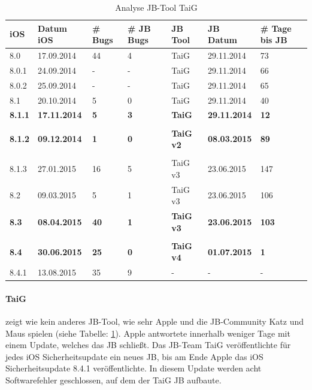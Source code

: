 \begin{table}[htp!]
    \begin{center}
        \begin{tabular}{| p{10mm} | p{22mm} | p{17mm} | p{12mm} | p{18mm} | p{22mm} | p{15mm} |} \hline
            \textbf{iOS} & \textbf{Datum iOS} & \textbf{\# Bugs} & \textbf{\# JB Bugs} & \textbf{JB Tool} & \textbf{JB Datum} & \textbf{\# Tage bis JB} \\ \hline 
8.0 & 17.09.2014 & 44 & 4 & TaiG & 29.11.2014 & 73  \\ \hline
8.0.1 & 24.09.2014	& - & - & TaiG & 29.11.2014 & 66 \\ \hline
8.0.2 & 25.09.2014 & - & -  & TaiG & 29.11.2014 & 65  \\ \hline
8.1 & 20.10.2014 & 5 & 0 & TaiG & 29.11.2014 & 40  \\ \hline
\textbf{8.1.1} & \textbf{17.11.2014} & \textbf{5} & \textbf{3} & \textbf{TaiG} & \textbf{29.11.2014} & \textbf{12}  \\ \hline
 & & & & & & \\ \hline						
\textbf{8.1.2} & \textbf{09.12.2014} & \textbf{1} & \textbf{0} & \textbf{TaiG v2} & \textbf{08.03.2015} & \textbf{89}  \\ \hline
	 & & & & & & \\ \hline						
8.1.3 & 27.01.2015 & 16 & 5 & TaiG v3 & 23.06.2015 & 147  \\ \hline
8.2  & 09.03.2015 & 5 & 1 & TaiG v3 & 23.06.2015 & 106 \\ \hline
\textbf{8.3} &  \textbf{08.04.2015} & \textbf{40} & \textbf{1} & \textbf{TaiG v3} & \textbf{23.06.2015} & \textbf{103}  \\ \hline
		 & & & & & & \\ \hline					
\textbf{8.4} &  \textbf{30.06.2015} & \textbf{25} & \textbf{0} & \textbf{TaiG v4} & \textbf{01.07.2015} & \textbf{1}  \\ \hline
8.4.1 & 13.08.2015 & 35 & 9 & - & - & -   \\ \hline
        \end{tabular} 
        \caption{Analyse JB-Tool TaiG \protect\footnotemark}
        \label{tab:AnalyseTaig}
    \end{center}
\end{table}

\paragraph{TaiG} zeigt wie kein anderes JB-Tool, wie sehr Apple und die JB-Community Katz und Maus spielen  (siehe Tabelle: \ref{tab:AnalyseTaig}). Apple antwortete innerhalb weniger Tage mit einem Update, welches das JB schließt. Das JB-Team TaiG veröffentlichte für jedes iOS Sicherheitsupdate ein neues JB, bis am Ende Apple das iOS Sicherheitsupdate 8.4.1 veröffentlichte. In diesem Update werden acht Softwarefehler geschlossen, auf dem der TaiG JB aufbaute. 
 
